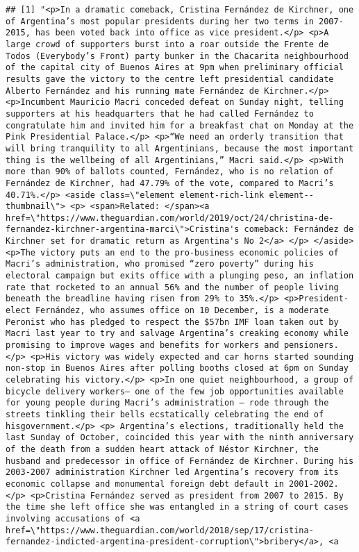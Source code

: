 \documentclass[]{article}
\begin{document}
\begin{verbatim}
## [1] "<p>In a dramatic comeback, Cristina Fernández de Kirchner, one of Argentina’s most popular presidents during her two terms in 2007-2015, has been voted back into office as vice president.</p> <p>A large crowd of supporters burst into a roar outside the Frente de Todos (Everybody’s Front) party bunker in the Chacarita neighbourhood of the capital city of Buenos Aires at 9pm when preliminary official results gave the victory to the centre left presidential candidate Alberto Fernández and his running mate Fernández de Kirchner.</p> <p>Incumbent Mauricio Macri conceded defeat on Sunday night, telling supporters at his headquarters that he had called Fernández to congratulate him and invited him for a breakfast chat on Monday at the Pink Presidential Palace.</p> <p>“We need an orderly transition that will bring tranquility to all Argentinians, because the most important thing is the wellbeing of all Argentinians,” Macri said.</p> <p>With more than 90% of ballots counted, Fernández, who is no relation of Fernández de Kirchner, had 47.79% of the vote, compared to Macri’s 40.71%.</p> <aside class=\"element element-rich-link element--thumbnail\"> <p> <span>Related: </span><a href=\"https://www.theguardian.com/world/2019/oct/24/christina-de-fernandez-kirchner-argentina-marci\">Cristina's comeback: Fernández de Kirchner set for dramatic return as Argentina's No 2</a> </p> </aside>  <p>The victory puts an end to the pro-business economic policies of Macri’s administration, who promised “zero poverty” during his electoral campaign but exits office with a plunging peso, an inflation rate that rocketed to an annual 56% and the number of people living beneath the breadline having risen from 29% to 35%.</p> <p>President-elect Fernández, who assumes office on 10 December, is a moderate Peronist who has pledged to respect the $57bn IMF loan taken out by Macri last year to try and salvage Argentina’s creaking economy while promising to improve wages and benefits for workers and pensioners.</p> <p>His victory was widely expected and car horns started sounding non-stop in Buenos Aires after polling booths closed at 6pm on Sunday celebrating his victory.</p> <p>In one quiet neighbourhood, a group of bicycle delivery workers– one of the few job opportunities available for young people during Macri’s administration – rode through the streets tinkling their bells ecstatically celebrating the end of hisgovernment.</p> <p> Argentina’s elections, traditionally held the last Sunday of October, coincided this year with the ninth anniversary of the death from a sudden heart attack of Néstor Kirchner, the husband and predecessor in office of Fernández de Kirchner. During his 2003-2007 administration Kirchner led Argentina’s recovery from its economic collapse and monumental foreign debt default in 2001-2002.</p> <p>Cristina Fernández served as president from 2007 to 2015. By the time she left office she was entangled in a string of court cases involving accusations of <a href=\"https://www.theguardian.com/world/2018/sep/17/cristina-fernandez-indicted-argentina-president-corruption\">bribery</a>, <a 
\end{verbatim}
\end{document}
